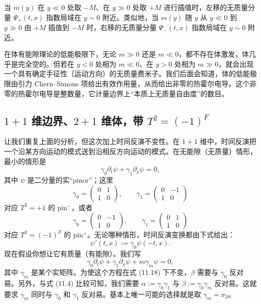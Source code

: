 当 $m(y)$ 在 $y\ll0$ 处取 $-M$、在 $y\gg0$ 处取 $+M$ 进行插值时，左移的无质量分量 $\Psi_+(t,x)$ 指数局域在 $y\sim0$ 附近。类似地，当 $m(y)$ 随 $y$ 从 $y\ll0$ 到 $y\gg0$ 由 $+M$ 插值到 $-M$ 时，右移的无质量分量 $\Psi_-(t,x)$ 指数局域在 $y\sim0$ 附近。

在体有能隙理论的低能极限下，无论 $m\gg0$ 还是 $m\ll0$，都不存在体激发，体几乎是完全空的。但若在 $y<0$ 处相为 $m\ll0$、在 $y>0$ 处相为 $m\gg0$，就会出现一个具有确定手征性（运动方向）的无质量费米子。我们后面会知道，体的低能极限由引力 Chern--Simons 项给出有效作用量，从而给出非零的热霍尔电导。这个非零的热霍尔电导是整数量，它计量边界上“本质上无质量自由度”的数目。

\subsection{$1+1$ 维边界、$2+1$ 维体，带 $T^2=(-1)^F$}

让我们重复上面的分析，但这次加上时间反演不变性。在 $1+1$ 维中，时间反演把一个沿某方向运动的模式送到沿相反方向运动的模式。在无能隙（无质量）情形，最小的情形是
\begin{equation}
\gamma_0\partial_t\psi+\gamma_1\partial_x\psi=0, \tag{11.15}
\end{equation}
其中 $\psi$ 是二分量的实“pinor”；这里
\begin{equation}
\gamma_0=\begin{pmatrix}0&1\\1&0\end{pmatrix},\qquad
\gamma_1=\begin{pmatrix}0&-1\\1&0\end{pmatrix} \tag{11.16}
\end{equation}
对应 $T^2=+1$ 的 pin$^-$，或者
\begin{equation}
\gamma_0=\begin{pmatrix}0&-1\\1&0\end{pmatrix},\qquad
\gamma_1=\begin{pmatrix}0&1\\1&0\end{pmatrix} \tag{11.17}
\end{equation}
对应 $T^2=(-1)^F$ 的 pin$^+$。无论哪种情形，时间反演变换都由下式给出：
\begin{equation}
\psi'(t,x):=\gamma_0\psi(-t,x). \tag{11.18}
\end{equation}
现在假设你想让它有质量（有能隙）。我们写
\begin{equation}
\gamma_0\partial_t\psi+\gamma_1\partial_x\psi+m\gamma_m\psi=0, \tag{11.19}
\end{equation}
其中 $\gamma_m$ 是某个实矩阵。为使这个方程在式 (11.18) 下不变，$\beta$ 需要与 $\gamma_0$ 反对易。另外，与式 (11.4) 比较可知，我们需要 $\alpha:=\gamma_0\gamma_1$ 与 $\beta:=\gamma_0\gamma_m$ 反对易。这就要求 $\gamma_m$ 同时与 $\gamma_0$ 和 $\gamma_1$ 反对易。基本上唯一可能的选择就是取 $\gamma_m=\sigma_3$。%

